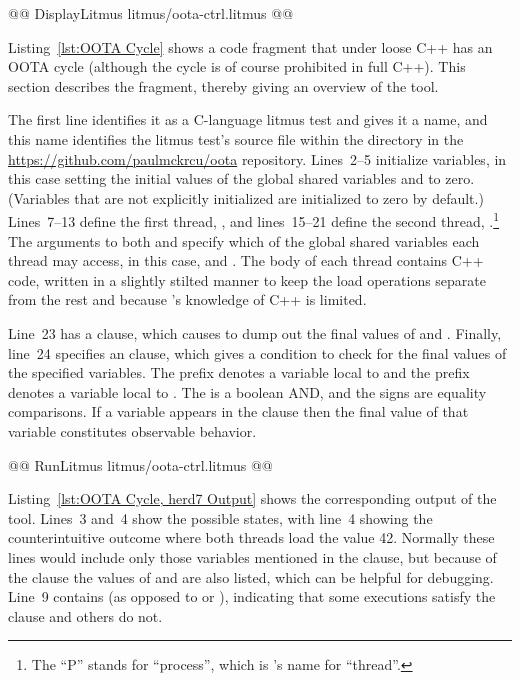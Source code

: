 \documentclass[10]{article}
\begin{document}
\begin{listing}[tbp]
@@ DisplayLitmus litmus/oota-ctrl.litmus @@
\caption{OOTA Cycle}
\label{lst:OOTA Cycle}
\end{listing}

Listing~\ref{lst:OOTA Cycle}
shows a code fragment that under loose C++ has an OOTA cycle (although
the cycle is of course prohibited in full C++).
This section describes the fragment, thereby giving an overview of
the  tool.

The first line identifies it as a C-language litmus test and gives it
a name, and this name identifies the litmus test's source file within
the  directory in the \url{https://github.com/paulmckrcu/oota}
repository.
Lines~2--5 initialize variables, in this case setting the initial
values of the global shared variables  and  to zero.
(Variables that are not explicitly initialized are initialized
to zero by default.)
Lines~7--13 define the first thread, , and lines~15--21
define the second thread, .\footnote{
	The ``P'' stands for ``process'', which is 's name
	for ``thread''.}
The arguments to both  and  specify which of
the global shared variables each thread may access, in this case, 
and .
The body of each thread contains C++ code,
written in a slightly stilted manner to keep the load operations separate
from the rest and because 's knowledge of C++ is limited.

Line~23 has a  clause, which causes
 to dump out the final values of  and .
Finally, line~24 specifies an  clause, which gives a
condition to check for the final values of the specified variables.
The  prefix denotes a variable local to  and
the  prefix denotes a variable local to .
The \co{/\\} is a boolean AND, and the \co{=} signs are equality comparisons.
If a variable appears in the  clause then the final value of
that variable constitutes observable behavior.

\begin{listing}[tbp]
@@ RunLitmus litmus/oota-ctrl.litmus @@
\caption{OOTA Cycle,  Output}
\label{lst:OOTA Cycle, herd7 Output}
\end{listing}

Listing~\ref{lst:OOTA Cycle, herd7 Output} shows the corresponding output
of the  tool.
Lines~3 and~4 show the possible states, with line~4 showing the
counterintuitive outcome where both threads load the value 42.
Normally these lines would include only those variables mentioned
in the  clause, but because of the  clause
the values of  and  are also listed, which
can be helpful for debugging.
Line~9 contains  (as opposed to  or ),
indicating that some executions satisfy the  clause and
others do not.
\end{document}
